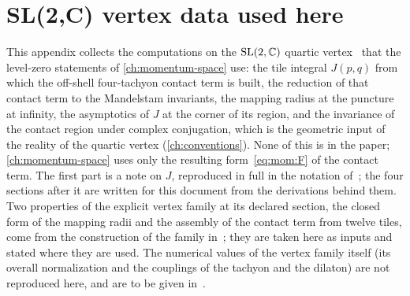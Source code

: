 \section{SL(2,C) vertex data used here}
\label{ch:sl2c-vertex}

This appendix collects the computations on the $\mathrm{SL}(2, \mathbb{C})$ quartic vertex~\cite{Erbin:2023:SL2CQuarticVertex} that the level-zero statements of \cref{ch:momentum-space} use: the tile integral $J(p, q)$ from which the off-shell four-tachyon contact term is built, the reduction of that contact term to the Mandelstam invariants, the mapping radius at the puncture at infinity, the asymptotics of $J$ at the corner of its region, and the invariance of the contact region under complex conjugation, which is the geometric input of the reality of the quartic vertex (\cref{ch:conventions}).
None of this is in the paper; \cref{ch:momentum-space} uses only the resulting form~\eqref{eq:mom:F} of the contact term.
The first part is a note on $J$, reproduced in full in the notation of~\cite{Erbin:2023:SL2CQuarticVertex}; the four sections after it are written for this document from the derivations behind them.
Two properties of the explicit vertex family at its declared section, the closed form of the mapping radii and the assembly of the contact term from twelve tiles, come from the construction of the family in~\cite{Erbin:2026:SL2CVerticesClosed}; they are taken here as inputs and stated where they are used.
The numerical values of the vertex family itself (its overall normalization and the couplings of the tachyon and the dilaton) are not reproduced here, and are to be given in~\cite{Erbin:2026:SL2CVerticesClosed}.

